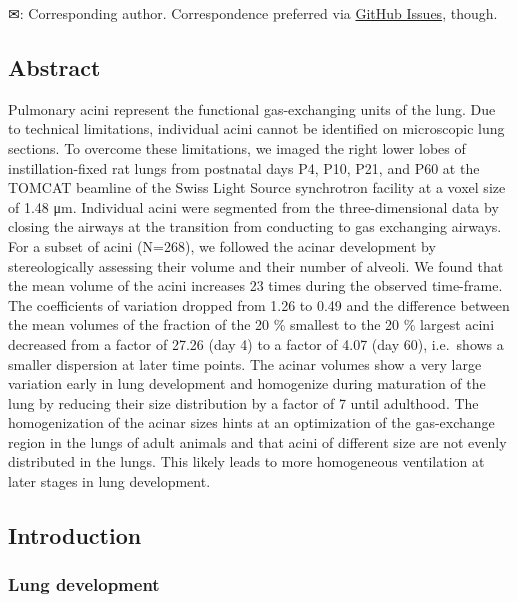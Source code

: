 \documentclass[
  american,
]{article}
\begin{document}
✉: Corresponding author. Correspondence preferred via \href{https://github.com/habi/acinar-analysis-manuscript/issues}{GitHub Issues}, though.

\hypertarget{abstract}{%
\subsection{Abstract}\label{abstract}}

Pulmonary acini represent the functional gas-exchanging units of the lung.
Due to technical limitations, individual acini cannot be identified on microscopic lung sections.
To overcome these limitations, we imaged the right lower lobes of instillation-fixed rat lungs from postnatal days P4, P10, P21, and P60 at the TOMCAT beamline of the Swiss Light Source synchrotron facility at a voxel size of 1.48 μm.
Individual acini were segmented from the three-dimensional data by closing the airways at the transition from conducting to gas exchanging airways.
For a subset of acini (N=268), we followed the acinar development by stereologically assessing their volume and their number of alveoli.
We found that the mean volume of the acini increases 23 times during the observed time-frame.
The coefficients of variation dropped from 1.26 to 0.49 and the difference between the mean volumes of the fraction of the 20 \% smallest to the 20 \% largest acini decreased from a factor of 27.26 (day 4) to a factor of 4.07 (day 60), i.e.~shows a smaller dispersion at later time points.
The acinar volumes show a very large variation early in lung development and homogenize during maturation of the lung by reducing their size distribution by a factor of 7 until adulthood.
The homogenization of the acinar sizes hints at an optimization of the gas-exchange region in the lungs of adult animals and that acini of different size are not evenly distributed in the lungs.
This likely leads to more homogeneous ventilation at later stages in lung development.

\hypertarget{introduction}{%
\subsection{Introduction}\label{introduction}}

\hypertarget{lung-development}{%
\subsubsection{Lung development}\label{lung-development}}
\end{document}

